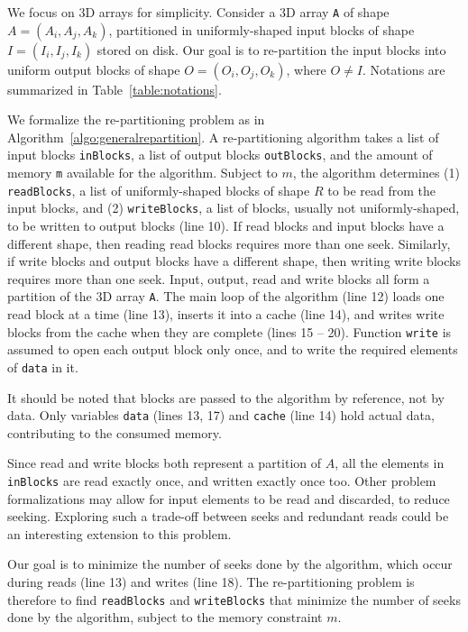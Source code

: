 \documentclass[sigconf, nonacm]{acmart}
\begin{document}
We focus on 3D arrays for simplicity. Consider a 3D array \texttt{A} of shape $A =
(A_i, A_j, A_k)$, partitioned in uniformly-shaped input blocks of shape $I =
(I_i, I_j, I_k)$ stored on disk. Our goal is to re-partition the input
blocks into uniform output blocks of shape $O = (O_i, O_j, O_k)$,
where $O \neq I$. Notations are summarized in
Table~\ref{table:notations}.

We formalize the re-partitioning problem as in Algorithm~\ref{algo:generalrepartition}.
A re-partitioning algorithm takes a
list of input blocks \texttt{inBlocks}, a list of output
blocks \texttt{outBlocks}, and the amount of memory \texttt{m}
available for the algorithm. Subject to $m$, the algorithm determines (1)
\texttt{readBlocks}, a list of uniformly-shaped blocks of shape $R$ to be read from the
input blocks, and (2) \texttt{writeBlocks}, a list of blocks,
usually not uniformly-shaped, to be written to output blocks (line 10).
If read blocks and input blocks have a different shape, then reading read blocks requires
more than one seek. Similarly, if write blocks and output blocks have a different shape,
then writing write blocks requires more than one seek. Input, output, read
and write blocks all form a partition of the 3D array \texttt{A}. The
main loop of the algorithm (line 12) loads one read block at a time (line
13), inserts it into a cache (line 14), and writes write blocks from the
cache when they are complete (lines 15 -- 20). Function \texttt{write} is assumed
to open each output block only once, and to write the required elements of \texttt{data} in it.

It should be noted that blocks are passed to the algorithm by reference,
not by data. Only variables \texttt{data} (lines 13, 17) and \texttt{cache}
(line 14) hold actual data, contributing to the consumed memory.

Since read and write blocks both represent a partition of $A$, all the
elements in \texttt{inBlocks} are read exactly once, and written exactly once too. Other
problem formalizations may allow for input elements to be read and
discarded, to reduce seeking. Exploring such a trade-off
between seeks and redundant reads could be an interesting extension to this problem.

Our goal is to minimize the number of seeks done by the algorithm, which
occur during reads (line 13) and writes (line 18). The re-partitioning
problem is therefore to find \texttt{readBlocks} and \texttt{writeBlocks} that
minimize the number of
seeks done by the algorithm, subject to the memory constraint $m$.
\end{document}

